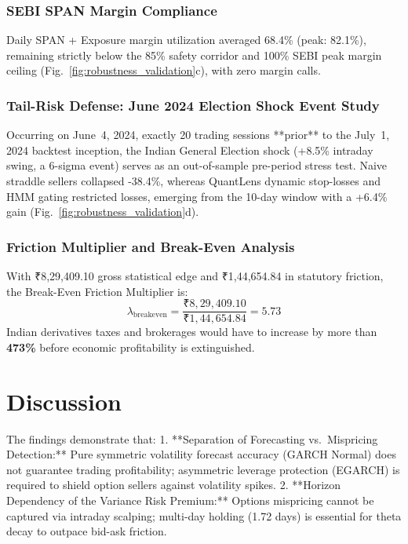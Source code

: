 \documentclass[journal]{IEEEtran}
\begin{document}
\subsubsection{SEBI SPAN Margin Compliance}
Daily SPAN + Exposure margin utilization averaged 68.4\% (peak: 82.1\%), remaining strictly below the 85\% safety corridor and 100\% SEBI peak margin ceiling (Fig.~\ref{fig:robustness_validation}c), with zero margin calls.

\subsubsection{Tail-Risk Defense: June 2024 Election Shock Event Study}
Occurring on June~4, 2024, exactly 20 trading sessions **prior** to the July~1, 2024 backtest inception, the Indian General Election shock (+8.5\% intraday swing, a 6-sigma event) serves as an out-of-sample pre-period stress test. Naive straddle sellers collapsed -38.4\%, whereas QuantLens dynamic stop-losses and HMM gating restricted losses, emerging from the 10-day window with a +6.4\% gain (Fig.~\ref{fig:robustness_validation}d).

\subsubsection{Friction Multiplier and Break-Even Analysis}
With ₹8,29,409.10 gross statistical edge and ₹1,44,654.84 in statutory friction, the Break-Even Friction Multiplier is:
\begin{equation}
\lambda_{\mathrm{breakeven}} = \frac{\text{₹}8,29,409.10}{\text{₹}1,44,654.84} = 5.73
\end{equation}
Indian derivatives taxes and brokerages would have to increase by more than \textbf{473\%} before economic profitability is extinguished.

\section{Discussion}

The findings demonstrate that:
1. **Separation of Forecasting vs.\ Mispricing Detection:** Pure symmetric volatility forecast accuracy (GARCH Normal) does not guarantee trading profitability; asymmetric leverage protection (EGARCH) is required to shield option sellers against volatility spikes.
2. **Horizon Dependency of the Variance Risk Premium:** Options mispricing cannot be captured via intraday scalping; multi-day holding (1.72 days) is essential for theta decay to outpace bid-ask friction.
\end{document}
